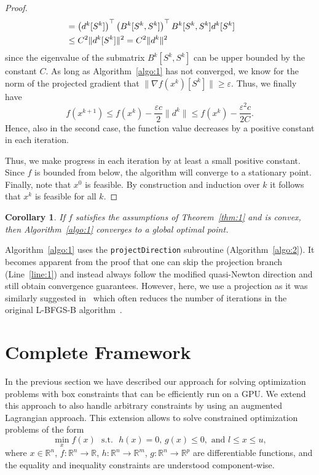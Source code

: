 \documentclass[letterpaper]{article} %
\newtheorem{corollary}[theorem]{Corollary}
\DeclareMathOperator{\st}{s.t.}
\newcommand{\setR}{\mathbb{R}}
\newcommand{\vareps}{\varepsilon}
\begin{document}
\begin{proof}
\[\begin{split}
& \hspace{-5ex} = \left(d^k[S^k]\right)^\top \left(B^k[S^k, S^k]\right)^\top B^k[S^k, S^k] d^k[S^k]\\
& \hspace{-5ex} \leq C^2 \|d^k[S^k]\|^2  = C^2 \|d^k\|^2
\end{split}
\]
since the eigenvalue of the submatrix $B^k[S^k, S^k]$ can be upper bounded by the constant $C$. %
As long as Algorithm~\ref{algo:1} has not converged, we know for the norm of the projected gradient that $\|\nabla f(x^k)[S^k]\| \geq \vareps$. Thus, we finally have
\[
f(x^{k+1}) \leq f(x^k) - \frac{\vareps c}{2}\|d^k\| \leq f(x^k) - \frac{\vareps^2 c}{2C}.
\]
Hence, also in the second case, the function value decreases by a positive constant in each iteration.

Thus, we make progress in each iteration by at least a small positive constant. Since $f$ is bounded from below, the algorithm will converge to a stationary point. Finally, note that $x^0$ is feasible. By construction and induction over $k$ it follows that $x^{k}$ is feasible for all $k$.
\end{proof}

\begin{corollary} If $f$ satisfies the assumptions of Theorem~\ref{thm:1} and is convex, then Algorithm~\ref{algo:1} converges to a global optimal point.
\end{corollary}

Algorithm~\ref{algo:1} uses the \texttt{projectDirection} subroutine (Algorithm~\ref{algo:2}). It becomes apparent from the proof that one can skip the projection branch (Line~\ref{line:1}) and instead always follow the modified quasi-Newton direction and still obtain convergence guarantees. However, here, we use a projection as it was similarly suggested in~\cite{MoralesN11} which often reduces the number of iterations in the original L-BFGS-B algorithm~\cite{ByrdLNZ95}. %

\section{Complete Framework} \label{sec:framework}
In the previous section we have described our approach for solving optimization problems with box constraints that can be efficiently run on a GPU. We extend this approach to also handle arbitrary constraints by using an augmented Lagrangian approach. This extension allows to solve constrained optimization problems of the form
\begin{equation} \label{eq:constrained}
\min_{x}  f(x) \:\,\st\:\, h(x) = 0,\, g(x) \leq 0, \textrm{ and } l \leq x \leq u,
\end{equation}
where $x\in\setR^n$, $f\colon \setR^n \to \setR$, $h\colon\setR^n\to\setR^m$, $g\colon\setR^n\to\setR^p$ are differentiable functions, and the equality and inequality constraints are understood component-wise.
\end{document}
